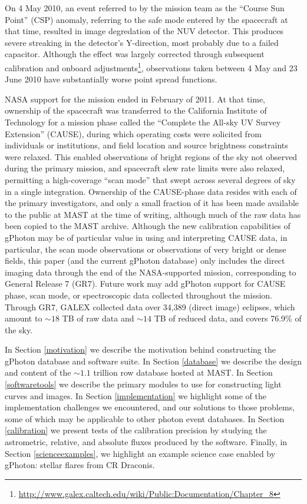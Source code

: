 \documentclass[5p]{elsarticle}
\begin{document}
On 4 May 2010, an event referred to by the mission team as the ``Course Sun Point'' (CSP) anomaly, referring to the safe mode entered by the spacecraft at that time, resulted in image degredation of the NUV detector. This produces severe streaking in the detector's Y-direction, most probably due to a failed capacitor. Although the effect was largely corrected through subsequent calibration and onboard adjustments\footnote{\url{http://www.galex.caltech.edu/wiki/Public:Documentation/Chapter_8}}, observations taken between 4 May and 23 June 2010 have substantially worse point spread functions.

NASA support for the mission ended in February of 2011. At that time, ownership of the spacecraft was transferred to the California Institute of Technology for a mission phase called the ``Complete the All-sky UV Survey Extension'' (CAUSE), during which operating costs were solicited from individuals or institutions, and field location and source brightness constraints were relaxed. This enabled observations of bright regions of the sky not observed during the primary mission, and spacecraft slew rate limits were also relaxed, permitting a high-coverage ``scan mode'' that swept across several degrees of sky in a single integration. Ownership of the CAUSE-phase data resides with each of the primary investigators, and only a small fraction of it has been made available to the public at MAST at the time of writing, although much of the raw data has been copied to the MAST archive. Although the new calibration capabilities of gPhoton may be of particular value in using and interpreting CAUSE data, in particular, the scan mode observations or observations of very bright or dense fields, this paper (and the current gPhoton database) only includes the direct imaging data through the end of the NASA-supported mission, corresponding to General Release 7 (GR7). Future work may add gPhoton support for CAUSE phase, scan mode, or spectroscopic data collected throughout the mission.  Through GR7, GALEX collected data over 34,389 (direct image) eclipses, which amount to $\sim 18$ TB of raw data and $\sim 14$ TB of reduced data, and covers 76.9\% of the sky.

In Section \ref{motivation} we describe the motivation behind constructing the gPhoton database and software suite. In Section \ref{database} we describe the design and content of the $\sim 1.1$ trillion row database hosted at MAST. In Section \ref{softwaretools} we describe the primary modules to use for constructing light curves and images.  In Section \ref{implementation} we highlight some of the implementation challenges we encountered, and our solutions to those problems, some of which may be applicable to other photon event databases. In Section \ref{calibration} we present tests of the calibration precision by studying the astrometric, relative, and absolute fluxes produced by the software.  Finally, in Section \ref{scienceexamples}, we highlight an example science case enabled by gPhoton: stellar flares from CR Draconis.
\end{document}
